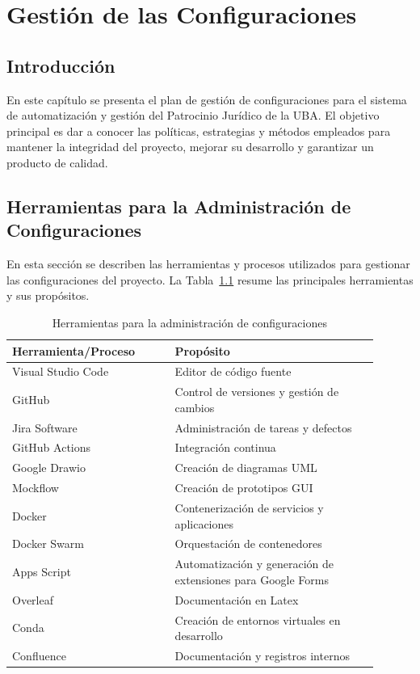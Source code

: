\chapter{Gestión de las Configuraciones}
\label{cap:estadoDelArte}

\section{Introducción}
En este capítulo se presenta el plan de gestión de configuraciones para el sistema de automatización y gestión del Patrocinio Jurídico de la UBA. El objetivo principal es dar a conocer las políticas, estrategias y métodos empleados para mantener la integridad del proyecto, mejorar su desarrollo y garantizar un producto de calidad.


\section{Herramientas para la Administración de Configuraciones}
En esta sección se describen las herramientas y procesos utilizados para gestionar las configuraciones del proyecto. La Tabla~\ref{tabla:gestionConfiguraciones} resume las principales herramientas y sus propósitos.


\begin{table}[h]
  \renewcommand{\arraystretch}{1.5}  %
  \begin{tabular}{p{0.4\linewidth}p{0.5\linewidth}}
    \toprule
    \textbf{Herramienta/Proceso} & \textbf{Propósito} \\
    \midrule
    Visual Studio Code & Editor de código fuente \\
    GitHub & Control de versiones y gestión de cambios \\
    Jira Software & Administración de tareas y defectos \\
    GitHub Actions & Integración continua \\
    Google Drawio & Creación de diagramas UML \\
    Mockflow  &   Creación de prototipos GUI \\
    Docker & Contenerización de servicios y aplicaciones \\
    Docker Swarm & Orquestación de contenedores \\ 
    Apps Script & Automatización y generación de extensiones para Google Forms \\
    Overleaf & Documentación en Latex \\
    Conda   & Creación de entornos virtuales en desarrollo \\
    Confluence & Documentación y registros internos \\
    \bottomrule
  \end{tabular}
  \caption{Herramientas para la administración de configuraciones}
  \label{tabla:gestionConfiguraciones}
\end{table}



